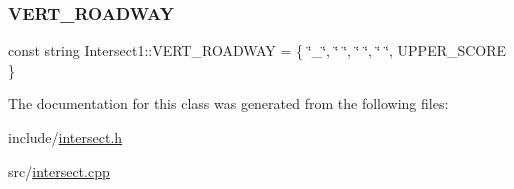 \subsubsection{\texorpdfstring{V\+E\+R\+T\+\_\+\+R\+O\+A\+D\+W\+AY}{VERT\_ROADWAY}}
{\footnotesize\ttfamily const string Intersect1\+::\+V\+E\+R\+T\+\_\+\+R\+O\+A\+D\+W\+AY = \{ \char`\"{}\+\_\+\char`\"{}, \char`\"{} \char`\"{}, \char`\"{} \char`\"{}, \char`\"{} \char`\"{}, U\+P\+P\+E\+R\+\_\+\+S\+C\+O\+RE \}\hspace{0.3cm}{\ttfamily [static]}}



The documentation for this class was generated from the following files\+:\begin{DoxyCompactItemize}
\item 
include/\hyperlink{intersect_8h}{intersect.\+h}\item 
src/\hyperlink{intersect_8cpp}{intersect.\+cpp}\end{DoxyCompactItemize}
